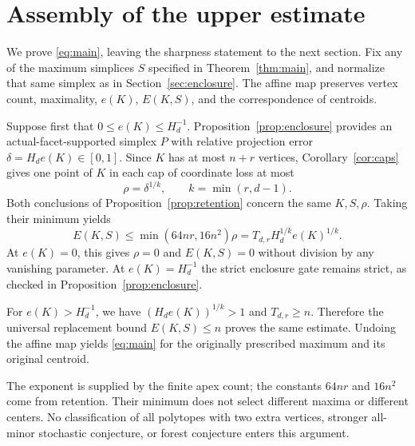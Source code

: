 \section{Assembly of the upper estimate}
\label{sec:assembly}
We prove \eqref{eq:main}, leaving the sharpness statement to the next
section. Fix any of the maximum simplices $S$ specified in
Theorem~\ref{thm:main}, and normalize that same simplex as in
Section~\ref{sec:enclosure}. The affine map preserves vertex count,
maximality, $e(K)$, $E(K,S)$, and the correspondence of centroids.

Suppose first that $0\le e(K)\le H_d^{-1}$. Proposition~\ref{prop:enclosure}
provides an actual-facet-supported simplex $P$ with relative projection
error $\delta=H_de(K)\in[0,1]$. Since $K$ has at most $n+r$ vertices,
Corollary~\ref{cor:caps} gives one point of $K$ in each cap of coordinate
loss at most
\[
 \rho=\delta^{1/k},\qquad k=\min(r,d-1).
\]
Both conclusions of Proposition~\ref{prop:retention} concern the same
$K,S,\rho$. Taking their minimum yields
\[
 E(K,S)\le\min(64nr,16n^2)\rho
 =T_{d,r}H_d^{1/k}e(K)^{1/k}.
\]
At $e(K)=0$, this gives $\rho=0$ and $E(K,S)=0$ without division by
any vanishing parameter. At $e(K)=H_d^{-1}$ the strict enclosure gate
remains strict, as checked in Proposition~\ref{prop:enclosure}.

For $e(K)>H_d^{-1}$, we have $(H_de(K))^{1/k}>1$ and
$T_{d,r}\ge n$. Therefore the universal replacement bound $E(K,S)\le n$
proves the same estimate. Undoing the affine map yields \eqref{eq:main}
for the originally prescribed maximum and its original centroid.

The exponent is supplied by the finite apex count; the constants $64nr$
and $16n^2$ come from retention. Their minimum does not select different
maxima or different centers. No classification of all polytopes with two
extra vertices, stronger all-minor stochastic conjecture, or forest
conjecture enters this argument.
